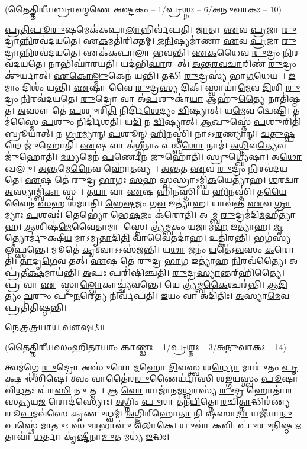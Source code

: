 \centerline{\normalsize (𑌤𑍈𑌤𑍍𑌤𑌿𑌰𑍀𑌯𑌬𑍍𑌰𑌾𑌹𑍍𑌮𑌣𑍇 𑌅𑌷𑍍𑌟𑌕𑌂 – 1/𑌪𑍍𑌰𑌶𑍍𑌨𑌃 – 6/𑌅𑌨𑍁𑌵𑌾𑌕𑌃 – 10)}

\ul{𑌪𑍍𑌰}\ul{𑌤𑌿}\ul{𑌪𑍂}\ul{𑌰𑍁}𑌷𑌮𑍇𑌕॑𑌕𑌪𑌾\ul{𑌲𑌾}𑌨𑍍𑌨𑌿𑌰𑍍𑌵॑𑌪𑌤𑌿। \ul{𑌜𑌾}𑌤𑌾 \ul{𑌏}𑌵 \ul{𑌪𑍍𑌰}𑌜𑌾 \ul{𑌰𑍁}𑌦𑍍𑌰𑌾\ul{𑌨𑍍𑌨𑌿}𑌰𑌵॑𑌦𑌯𑌤𑍇। 𑌏\ul{𑌕}𑌮𑌤𑌿॑𑌰𑌿𑌕𑍍𑌤𑌮𑍍। \ul{𑌜}\ul{𑌨𑌿}𑌷𑍍𑌯𑌮𑌾॑𑌣𑌾 \ul{𑌏}𑌵 \ul{𑌪𑍍𑌰}𑌜𑌾 \ul{𑌰𑍁}𑌦𑍍𑌰𑌾\ul{𑌨𑍍𑌨𑌿}𑌰𑌵॑𑌦𑌯𑌤𑍇। 𑌏𑌕॑𑌕𑌪𑌾𑌲𑌾 𑌭𑌵𑌨𑍍𑌤𑌿। \ul{𑌏}\ul{𑌕}𑌧𑍈𑌵 \ul{𑌰𑍁}𑌦𑍍𑌰𑌂 \ul{𑌨𑌿}𑌰𑌵॑𑌦𑌯𑌤𑍇। 𑌨𑌾𑌭𑌿𑌘𑌾॑𑌰𑌯𑌤𑌿। 𑌯𑌦॑𑌭𑌿\ul{𑌘𑌾}𑌰𑌯𑍇᳚𑌤𑍍। \ul{𑌅}\ul{𑌨𑍍𑌤}\ul{𑌰}\ul{𑌵}\ul{𑌚𑌾}𑌰𑌿𑌣॑ \ul{𑌰𑍁}𑌦𑍍𑌰𑌂 𑌕𑍁॑𑌰𑍍𑌯𑌾𑌤𑍍। \ul{𑌏}\ul{𑌕𑍋}\ul{𑌲𑍍𑌮𑍁}𑌕𑍇𑌨॑ 𑌯𑌨𑍍𑌤𑌿। 
𑌤𑌦𑍍𑌧𑌿 \ul{𑌰𑍁}𑌦𑍍𑌰𑌸𑍍𑌯॑ 𑌭𑌾\ul{𑌗}𑌧𑍇𑌯𑌮𑍍᳚। \ul{𑌇}𑌮𑌾𑌂 𑌦𑌿𑌶𑌂॑ 𑌯𑌨𑍍𑌤𑌿। \ul{𑌏}𑌷𑌾 𑌵𑍈 \ul{𑌰𑍁}𑌦𑍍𑌰\ul{𑌸𑍍𑌯} 𑌦𑌿𑌕𑍍। 𑌸𑍍𑌵𑌾𑌯𑌾॑\ul{𑌮𑍇}𑌵 \ul{𑌦𑌿}𑌶𑌿 \ul{𑌰𑍁}𑌦𑍍𑌰𑌂 \ul{𑌨𑌿}𑌰𑌵॑𑌦𑌯𑌤𑍇। \ul{𑌰𑍁}𑌦𑍍𑌰𑍋 𑌵𑌾 𑌅॑\ul{𑌪}𑌶𑍁𑌕𑌾॑\ul{𑌯𑌾} 𑌆𑌹𑍁॑\ul{𑌤𑍍𑌯𑍈} 𑌨𑌾𑌤𑌿॑𑌷𑍍𑌠𑌤। \ul{𑌅}𑌸𑍗 𑌤𑍇॑ \ul{𑌪}𑌶𑍁𑌰𑌿\ul{𑌤𑌿} 𑌨𑌿𑌰𑍍𑌦𑌿॑\ul{𑌶𑍇}𑌦𑍍𑌯𑌂 \ul{𑌦𑍍𑌵𑌿}𑌷𑍍𑌯𑌾𑌤𑍍। 𑌯\ul{𑌮𑍇}𑌵 𑌦𑍍𑌵𑍇𑌷𑍍𑌟𑌿॑। 𑌤𑌮॑𑌸𑍍𑌮𑍈 \ul{𑌪}𑌶𑍁𑌂 𑌨𑌿𑌰𑍍𑌦𑌿॑𑌶𑌤𑌿। 𑌯\ul{𑌦𑌿} 𑌨 \ul{𑌦𑍍𑌵𑌿}𑌷𑍍𑌯𑌾𑌤𑍍। \ul{𑌆}𑌖𑍁𑌸𑍍𑌤𑍇॑ \ul{𑌪}𑌶𑍁𑌰𑌿𑌤𑌿॑ 𑌬𑍍𑌰𑍂𑌯𑌾𑌤𑍍। 
𑌨 \ul{𑌗𑍍𑌰𑌾}𑌮𑍍𑌯𑌾𑌨𑍍 \ul{𑌪}𑌶𑍂𑌨𑍍 \ul{𑌹𑌿}𑌨𑌸𑍍𑌤𑌿॑। 𑌨𑌾𑌽𑌽\ul{𑌰}𑌣𑍍𑌯𑌾𑌨𑍍। \ul{𑌚}\ul{𑌤𑍁}\ul{𑌷𑍍𑌪}𑌥𑍇 𑌜𑍁॑𑌹𑍋𑌤𑌿। \ul{𑌏}𑌷 𑌵𑌾 𑌅॑\ul{𑌗𑍍𑌨𑍀}𑌨𑌾𑌂 𑌪𑌡𑍍𑌬𑍀॑\ul{𑌶𑍋} 𑌨𑌾𑌮॑। \ul{𑌅}\ul{𑌗𑍍𑌨𑌿}𑌵\ul{𑌤𑍍𑌯𑍇}𑌵 𑌜𑍁॑𑌹𑍋𑌤𑌿। \ul{𑌮}\ul{𑌧𑍍𑌯}𑌮𑍇𑌨॑ \ul{𑌪}𑌰𑍍𑌣𑍇𑌨॑ 𑌜𑍁𑌹𑍋𑌤𑌿। 𑌸𑍍𑌰𑍁𑌗𑍍𑌘𑍍𑌯𑍇॑𑌷𑌾। 𑌅\ul{𑌥𑍋} 𑌖𑌲𑍁॑। \ul{𑌅}\ul{𑌨𑍍𑌤}𑌮𑍇\ul{𑌨𑍈}𑌵 𑌹𑍋॑\ul{𑌤}𑌵𑍍𑌯𑌮𑍍᳚। \ul{𑌅}\ul{𑌨𑍍𑌤}𑌤 \ul{𑌏}𑌵 \ul{𑌰𑍁}𑌦𑍍𑌰𑌂 \ul{𑌨𑌿}𑌰𑌵॑𑌦𑌯𑌤𑍇। 
\ul{𑌏}𑌷 𑌤𑍇॑ 𑌰𑍁𑌦𑍍𑌰 \ul{𑌭𑌾}𑌗𑌃 \ul{𑌸}𑌹 𑌸𑍍𑌵𑌸𑍍𑌰𑌾𑌽𑌮𑍍𑌬𑌿॑\ul{𑌕}𑌯𑍇𑌤𑍍𑌯𑌾॑𑌹। \ul{𑌶}𑌰𑌦𑍍𑌵𑌾 \ul{𑌅}𑌸𑍍𑌯𑌾𑌮𑍍𑌬𑌿॑\ul{𑌕𑌾} 𑌸𑍍𑌵𑌸𑌾᳚। 𑌤\ul{𑌯𑌾} 𑌵𑌾 \ul{𑌏}𑌷 𑌹𑌿॑𑌨𑌸𑍍𑌤𑌿। 𑌯 \ul{𑌹𑌿}𑌨𑌸𑍍𑌤𑌿॑। 𑌤\ul{𑌯𑍈}𑌵𑍈𑌨॑ \ul{𑌸}𑌹 𑌶॑𑌮𑌯𑌤𑌿। \ul{𑌭𑍇}\ul{𑌷}𑌜𑌂 𑌗\ul{𑌵} 𑌇𑌤𑍍𑌯𑌾॑𑌹। 𑌯𑌾𑌵॑𑌨𑍍𑌤 \ul{𑌏}𑌵 \ul{𑌗𑍍𑌰𑌾}𑌮𑍍𑌯𑌾𑌃 \ul{𑌪}𑌶𑌵𑌃॑। 𑌤𑍇𑌭𑍍𑌯𑍋॑ 𑌭𑍇\ul{𑌷}𑌜𑌂 𑌕॑𑌰𑍋𑌤𑌿। 𑌅𑌵𑌾᳚𑌮𑍍𑌬 \ul{𑌰𑍁}𑌦𑍍𑌰𑌮॑𑌦𑌿\ul{𑌮}𑌹𑍀𑌤𑍍𑌯𑌾॑𑌹। \ul{𑌆}𑌶𑌿𑌷॑\ul{𑌮𑍇}𑌵𑍈𑌤𑌾𑌮𑌾𑌶𑌾᳚𑌸𑍍𑌤𑍇। 
𑌤𑍍𑌰𑍍𑌯॑𑌮𑍍𑌬𑌕𑌂 𑌯𑌜𑌾𑌮\ul{𑌹} 𑌇𑌤𑍍𑌯𑌾॑𑌹। \ul{𑌮𑍃}𑌤𑍍𑌯𑍋𑌰𑍍𑌮𑍁॑𑌕𑍍𑌷𑍀\ul{𑌯} 𑌮𑌾𑌽𑌮𑍃\ul{𑌤𑌾}𑌦𑌿\ul{𑌤𑌿} 𑌵𑌾𑌵𑍈𑌤𑌦𑌾॑𑌹। 𑌉𑌤𑍍𑌕𑌿॑𑌰𑌨𑍍𑌤𑌿। 𑌭𑌗॑𑌸𑍍𑌯 𑌲𑍀𑌫𑍍𑌸𑌨𑍍𑌤𑍇। 𑌮𑍂𑌤𑍇॑ \ul{𑌕𑍃}𑌤𑍍𑌵𑌾𑌽𑌽𑌸॑𑌜𑌨𑍍𑌤𑌿। 𑌯\ul{𑌥𑌾} 𑌜𑌨𑌂॑ \ul{𑌯}𑌤𑍇॑𑌽\ul{𑌵}𑌸𑌂 \ul{𑌕}𑌰𑍋𑌤𑌿॑। \ul{𑌤𑌾}𑌦𑍃\ul{𑌗𑍇}𑌵 𑌤𑌤𑍍। \ul{𑌏}𑌷 𑌤𑍇॑ 𑌰𑍁𑌦𑍍𑌰 \ul{𑌭𑌾}𑌗 𑌇𑌤𑍍𑌯𑌾॑𑌹 \ul{𑌨𑌿}𑌰𑌵॑𑌤𑍍𑌯𑍈। 𑌅𑌪𑍍𑌰॑𑌤𑍀\ul{𑌕𑍍𑌷}𑌮𑌾𑌯॑𑌨𑍍𑌤𑌿। \ul{𑌅}𑌪𑌃 𑌪𑌰𑌿॑𑌷𑌿𑌞𑍍𑌚𑌤𑌿। \mbox{\ul{𑌰𑍁}𑌦𑍍𑌰\ul{𑌸𑍍𑌯𑌾}𑌨𑍍𑌤𑌰𑍍‌\mbox{}𑌹𑌿॑𑌤𑍍𑌯𑍈}। 𑌪𑍍𑌰 𑌵𑌾 \ul{𑌏}𑌤𑍇᳚𑌸𑍍𑌮𑌾\ul{𑌲𑍍𑌲𑍋}𑌕𑌾𑌚𑍍𑌚𑍍𑌯॑𑌵𑌨𑍍𑌤𑍇। 𑌯𑍇 𑌤𑍍𑌰𑍍𑌯॑𑌮𑍍𑌬\ul{𑌕𑍈}𑌶𑍍𑌚𑌰॑𑌨𑍍𑌤𑌿। \ul{𑌆}\ul{𑌦𑌿}𑌤𑍍𑌯𑌂 \ul{𑌚}𑌰𑍁𑌂 𑌪𑍁\ul{𑌨}𑌰𑍇\ul{𑌤𑍍𑌯} 𑌨𑌿𑌰𑍍𑌵॑𑌪𑌤𑌿। \ul{𑌇}𑌯𑌂 𑌵𑌾 𑌅𑌦𑌿॑𑌤𑌿𑌃। \ul{𑌅}𑌸𑍍𑌯𑌾\ul{𑌮𑍇}𑌵 𑌪𑍍𑌰𑌤𑌿॑𑌤𑌿𑌷𑍍𑌠𑌨𑍍𑌤𑌿। 

𑌨𑍇𑌤𑍍𑌰𑌤𑍍𑌰𑌯𑌾𑌯 𑌵𑍗𑌷𑌟𑍍॥

{\small \closesection}



{}
\centerline{\normalsize (𑌤𑍈𑌤𑍍𑌤𑌿𑌰𑍀𑌯𑌸𑌂𑌹𑌿𑌤𑌾𑌯𑌾𑌂 𑌕𑌾𑌣𑍍𑌡𑌃 – 1/𑌪𑍍𑌰𑌶𑍍𑌨𑌃 – 3/𑌅𑌨𑍁𑌵𑌾𑌕𑌃 – 14)}

𑌤𑍍𑌵𑌮॑𑌗𑍍𑌨𑍇 \ul{𑌰𑍁}𑌦𑍍𑌰𑍋 𑌅𑌸𑍁॑𑌰𑍋 \ul{𑌮}𑌹𑍋 \ul{𑌦𑌿}𑌵𑌸𑍍𑌤𑍍𑌵 𑌶\ul{𑌰𑍍𑌧𑍋} 𑌮𑌾𑌰𑍁॑𑌤𑌂 \ul{𑌪𑍃}𑌕𑍍𑌷 𑌈॑𑌶𑌿𑌷𑍇। 𑌤𑍍𑌵𑌂 𑌵𑌾𑌤𑍈॑𑌰\ul{𑌰𑍁}𑌣𑍈𑌰𑍍𑌯𑌾॑𑌸𑌿 𑌶\ul{𑌙𑍍𑌗}𑌯𑌸𑍍𑌤𑍍𑌵𑌂 \ul{𑌪𑍂}𑌷𑌾 𑌵𑌿॑\ul{𑌧}𑌤𑌃 𑌪𑌾॑\ul{𑌸𑌿} 𑌨𑍁 𑌤𑍍𑌮𑌨𑌾᳚।
𑌆 \ul{𑌵𑍋} 𑌰𑌾𑌜𑌾॑𑌨𑌮\ul{𑌧𑍍𑌵}𑌰𑌸𑍍𑌯॑ \ul{𑌰𑍁}𑌦𑍍𑌰 𑌹𑍋𑌤𑌾॑𑌰 𑌸\ul{𑌤𑍍𑌯}𑌯\ul{𑌜}\ul{} 𑌰𑍋𑌦॑𑌸𑍍𑌯𑍋𑌃। \ul{𑌅}𑌗𑍍𑌨𑌿𑌂 \ul{𑌪𑍁}𑌰𑌾 𑌤॑𑌨\ul{𑌯𑌿}𑌤𑍍𑌨𑍋\ul{𑌰}𑌚𑌿\ul{𑌤𑍍𑌤𑌾}𑌦𑍍𑌧𑌿𑌰॑𑌣𑍍𑌯𑌰𑍂\ul{𑌪}𑌮𑌵॑𑌸𑍇 𑌕𑍃𑌣𑍁𑌧𑍍𑌵𑌮𑍍। \ul{𑌅}𑌗𑍍𑌨𑌿𑌰𑍍‌𑌹𑍋\ul{𑌤𑌾} 𑌨𑌿 𑌷॑𑌸𑌾\ul{𑌦𑌾} 𑌯𑌜𑍀॑𑌯𑌾\ul{𑌨𑍁}𑌪𑌸𑍍𑌥𑍇॑ \ul{𑌮𑌾}𑌤𑍁𑌃 𑌸𑍁॑\ul{𑌰}𑌭𑌾𑌵𑍁॑ \ul{𑌲𑍋}𑌕𑍇। 𑌯𑍁𑌵𑌾॑ \ul{𑌕}𑌵𑌿: 𑌪𑍁॑𑌰𑍁\ul{𑌨𑌿}𑌷𑍍𑌠 \ul{𑌋}𑌤𑌾𑌵𑌾॑ \ul{𑌧}𑌰𑍍𑌤𑌾 𑌕𑍃॑\ul{𑌷𑍍𑌟𑍀}𑌨𑌾\ul{𑌮𑍁}𑌤 𑌮𑌧𑍍𑌯॑ \ul{𑌇}𑌦𑍍𑌧𑌃। 


